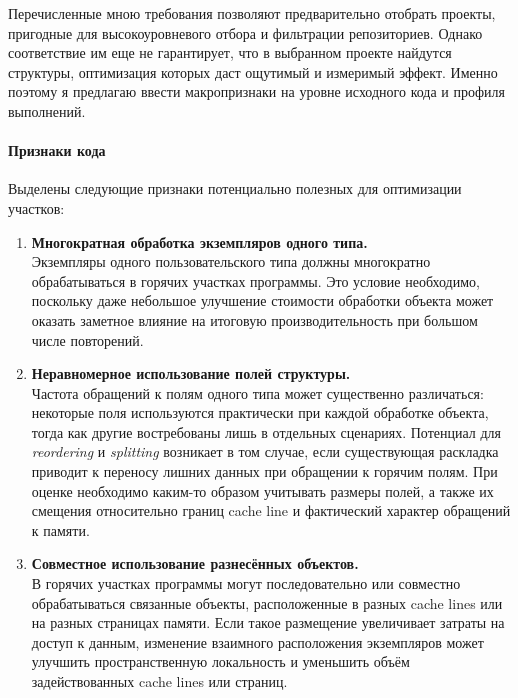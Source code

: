 \documentclass[a4paper,12pt]{article}
\begin{document}
Перечисленные мною требования позволяют предварительно отобрать проекты, пригодные для 
высокоуровневого отбора и фильтрации репозиториев. Однако соответствие им еще не
гарантирует, что в выбранном проекте найдутся структуры, оптимизация которых
даст ощутимый и измеримый эффект. Именно поэтому я предлагаю ввести
макропризнаки на уровне исходного кода и профиля выполнений.

\paragraph{Признаки кода}

Выделены следующие признаки потенциально полезных для оптимизации участков:

\begin{enumerate}
    \item \textbf{Многократная обработка экземпляров одного типа.}\\
    Экземпляры одного пользовательского типа должны многократно обрабатываться в горячих 
    участках программы. Это условие необходимо, поскольку даже небольшое улучшение 
    стоимости обработки объекта может оказать заметное влияние на итоговую 
    производительность при большом числе повторений.

    \item \textbf{Неравномерное использование полей структуры.}\\
    Частота обращений к полям одного типа может существенно различаться: некоторые поля 
    используются практически при каждой обработке объекта, тогда как другие востребованы 
    лишь в отдельных сценариях. Потенциал для \textit{reordering} и \textit{splitting} 
    возникает в том случае, если существующая раскладка приводит к переносу лишних 
    данных при обращении к горячим полям. При оценке необходимо каким-то образом 
    учитывать размеры полей, а также их смещения относительно границ cache line и 
    фактический характер обращений к памяти.

    \item \textbf{Совместное использование разнесённых объектов.}\\
    В горячих участках программы могут последовательно или совместно обрабатываться 
    связанные объекты, расположенные в разных cache lines или на разных страницах памяти.
    Если такое размещение увеличивает затраты на доступ к данным, изменение взаимного 
    расположения экземпляров может улучшить пространственную локальность и уменьшить объём 
    задействованных cache lines или страниц. 

\end{enumerate}
\end{document}
